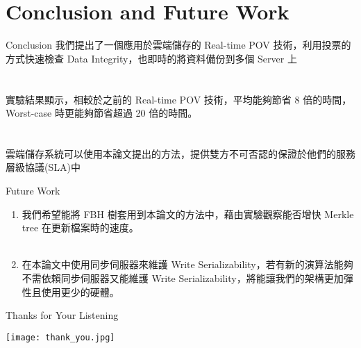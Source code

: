 \section{Conclusion and Future Work}

\begin{frame}{Conclusion}
	我們提出了一個應用於雲端儲存的 Real-time POV 技術，利用投票的方式快速檢查 Data Integrity，也即時的將資料備份到多個 Server 上\\
    ~\\
    ~\\
    實驗結果顯示，相較於之前的 Real-time POV 技術，平均能夠節省 8 倍的時間，Worst-case 時更能夠節省超過 20 倍的時間。\\
    ~\\
    ~\\
    雲端儲存系統可以使用本論文提出的方法，提供雙方不可否認的保證於他們的服務層級協議(SLA)中
\end{frame}

\begin{frame}{Future Work}
	\begin{enumerate}
		\item 我們希望能將 FBH 樹套用到本論文的方法中，藉由實驗觀察能否增快 Merkle tree 在更新檔案時的速度。\\
        ~\\
        \item 在本論文中使用同步伺服器來維護 Write Serializability，若有新的演算法能夠不需依賴同步伺服器又能維護 Write Serializability，將能讓我們的架構更加彈性且使用更少的硬體。
	\end{enumerate}
\end{frame}

\begin{frame}{Thanks for Your Listening}
	\begin{center}
		\texttt{[image: thank\_you.jpg]}
	\end{center}	
\end{frame}